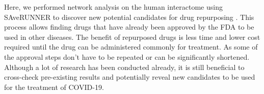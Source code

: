 Here, we performed network analysis on the human interactome using SAveRUNNER to discover new potential candidates for drug repurposing \cite{Fiscon2020, Fiscon2021}. This process allows finding drugs that have already been approved by the FDA to be used in other diseases.
The benefit of repurposed drugs is less time and lower cost required until the drug can be administered commonly for treatment. As some of the approval steps don't have to be repeated or can be significantly shortened. Although a lot of research has been conducted already, it is still beneficial to cross-check pre-existing results and potentially reveal new candidates to be used for the treatment of COVID-19.






